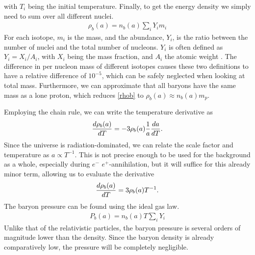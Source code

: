 with $T_i$ being the initial temperature. Finally, to get the energy density we simply need to sum over all different nuclei. 
\begin{align}
    \rho_b(a)=n_b(a)\sum_{i}^{}Y_i m_i
    \label{rhob}
\end{align}
For each isotope, $m_i$ is the mass, and the abundance, $Y_i$, is the ratio between the number of nuclei and the total number of nucleons. $Y_i$ is often defined as $Y_i=X_i/A_i$, with $X_i$ being the mass fraction, and $A_i$ the atomic weight \cite{Wagoner69}. The difference in per nucleon mass of different isotopes causes these two definitions to have a relative difference of $10^{-5}$, which can be safely neglected when looking at total mass. Furthermore, we can approximate that all baryons have the same mass as a lone proton, which reduces \eqref{rhob} to $\rho_b(a) \approx n_b(a)m_p$. 

Employing the chain rule, we can write the temperature derivative as 
\begin{align}
    \frac{d\rho_b(a)}{dT} = -3\rho_b(a)\frac{1}{a}\frac{da}{dT}.
\end{align}
Since the universe is radiation-dominated, we can relate the scale factor and temperature as $a\propto T^{-1}$. This is not precise enough to be used for the background as a whole, especially during $e^-$ $e^+$-annihilation, but it will suffice for this already minor term, allowing us to evaluate the derivative
\begin{align}
    \frac{d\rho_b(a)}{dT} = 3\rho_b(a)T^{-1}.
    \label{drhob}
\end{align}
The baryon pressure can be found using the ideal gas law.
\begin{align}
    P_b(a)= n_b(a)T\sum_{i}^{}Y_i
\end{align}
Unlike that of the relativistic particles, the baryon pressure is several orders of magnitude lower than the density. Since the baryon density is already comparatively low, the pressure will be completely negligible.




